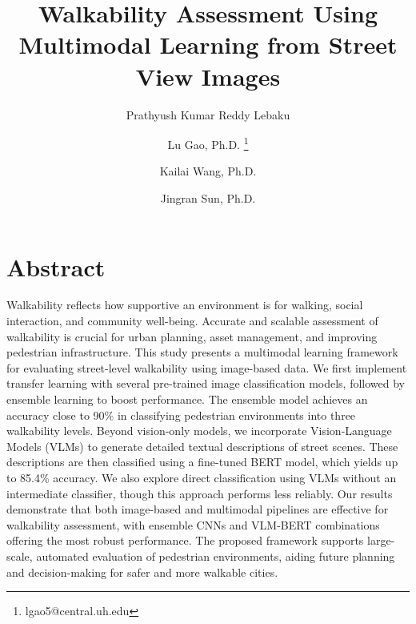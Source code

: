 \documentclass[11pt]{article}
\begin{document}

\title{Walkability Assessment Using Multimodal Learning from Street View Images}

\author[1]{\normalsize Prathyush Kumar Reddy Lebaku}
\author[1]{Lu Gao, Ph.D. \thanks{lgao5@central.uh.edu}}
\author[2]{Kailai Wang, Ph.D.}
\author[3]{Jingran Sun, Ph.D.}



\date{}

\maketitle       

\linenumbers 


\newpage
\section*{Abstract}
Walkability reflects how supportive an environment is for walking, social interaction, and community well-being. Accurate and scalable assessment of walkability is crucial for urban planning, asset management, and improving pedestrian infrastructure. This study presents a multimodal learning framework for evaluating street-level walkability using image-based data. We first implement transfer learning with several pre-trained image classification models, followed by ensemble learning to boost performance. The ensemble model achieves an accuracy close to 90\% in classifying pedestrian environments into three walkability levels. Beyond vision-only models, we incorporate Vision-Language Models (VLMs) to generate detailed textual descriptions of street scenes. These descriptions are then classified using a fine-tuned BERT model, which yields up to 85.4\% accuracy. We also explore direct classification using VLMs without an intermediate classifier, though this approach performs less reliably. Our results demonstrate that both image-based and multimodal pipelines are effective for walkability assessment, with ensemble CNNs and VLM-BERT combinations offering the most robust performance. The proposed framework supports large-scale, automated evaluation of pedestrian environments, aiding future planning and decision-making for safer and more walkable cities.
\end{document}

